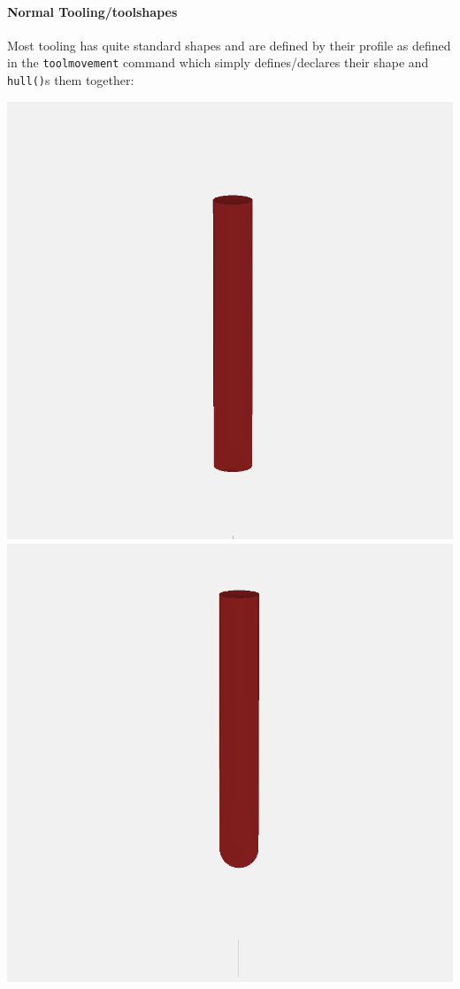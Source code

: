 \documentclass{ltxdoc}
\begin{document}
\begin{samepage}
\paragraph{Normal Tooling/toolshapes}

\label{para:normaltooling} Most tooling has quite standard shapes 
and are defined by their profile as defined in the \verb|toolmovement| command which simply defines/declares their shape and \verb|hull()|s them together:

  \noindent\includegraphics[width=\linewidth/3]{images/tool_square_201.png}%
           \includegraphics[width=\linewidth/3]{images/tool_ball_202.png}%

\end{samepage}
\end{document}
